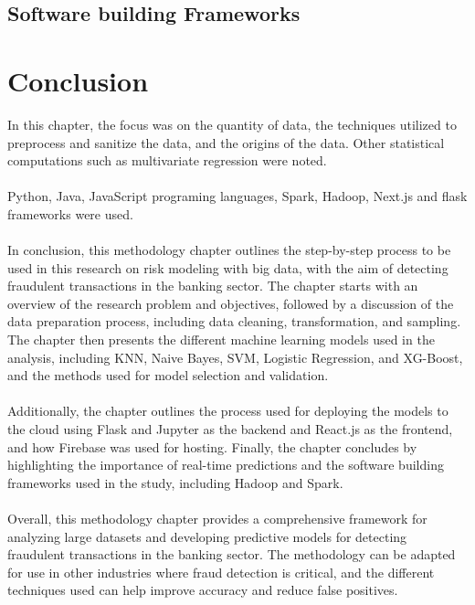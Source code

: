 \subsection{Software building Frameworks}

\section{Conclusion}

In this chapter, the focus was on the quantity of data, the techniques utilized to preprocess and sanitize the data, 
and the origins of the data. Other statistical computations such as multivariate regression were noted.\\\\
Python, Java, JavaScript programing languages, Spark, Hadoop, Next.js and flask frameworks were used.\\\\
In conclusion, this methodology chapter outlines the step-by-step process to be used in this research on risk 
modeling with big data, with the aim of detecting fraudulent transactions in the banking sector. The chapter 
starts with an overview of the research problem and objectives, followed by a discussion of the data preparation 
process, including data cleaning, transformation, and sampling. The chapter then presents the different machine 
learning models used in the analysis, including KNN, Naive Bayes, SVM, Logistic Regression, and XG-Boost, and 
the methods used for model selection and validation.\\\\
Additionally, the chapter outlines the process used for deploying the models to the cloud using Flask and Jupyter 
as the backend and React.js as the frontend, and how Firebase was used for hosting. Finally, the chapter concludes 
by highlighting the importance of real-time predictions and the software building frameworks used in the study, 
including Hadoop and Spark.\\\\
Overall, this methodology chapter provides a comprehensive framework for analyzing large datasets and developing 
predictive models for detecting fraudulent transactions in the banking sector. The methodology can be adapted for 
use in other industries where fraud detection is critical, and the different techniques used can help improve 
accuracy and reduce false positives.
